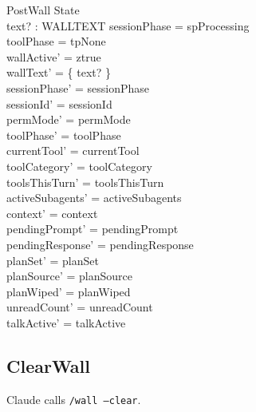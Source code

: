 \documentclass[a4paper,10pt,fleqn]{article}
\begin{document}
\begin{schema}{PostWall}
  \Delta State \\
  text? : WALLTEXT
  \where
  sessionPhase = spProcessing \\
  toolPhase = tpNone \\
  wallActive' = ztrue \\
  wallText' = \{ text? \} \\
  sessionPhase' = sessionPhase \\
  sessionId' = sessionId \\
  permMode' = permMode \\
  toolPhase' = toolPhase \\
  currentTool' = currentTool \\
  toolCategory' = toolCategory \\
  toolsThisTurn' = toolsThisTurn \\
  activeSubagents' = activeSubagents \\
  context' = context \\
  pendingPrompt' = pendingPrompt \\
  pendingResponse' = pendingResponse \\
  planSet' = planSet \\
  planSource' = planSource \\
  planWiped' = planWiped \\
  unreadCount' = unreadCount \\
  talkActive' = talkActive
\end{schema}

\subsection{ClearWall}

Claude calls \texttt{/wall --clear}.
\end{document}
